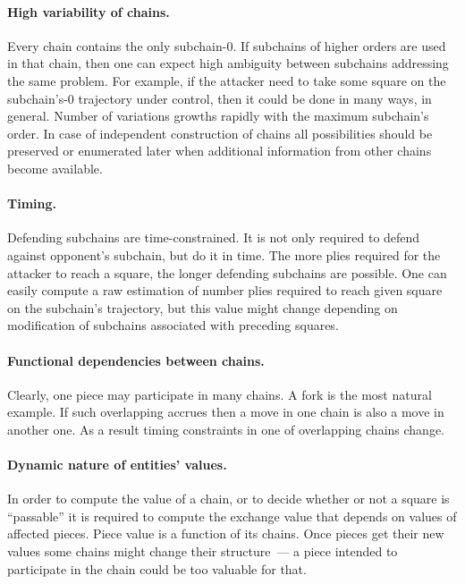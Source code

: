 \documentclass{llncs}
\begin{document}
\paragraph{High variability of chains.} Every chain contains the only
subchain-0. If subchains of higher orders are used in that chain, then
one can expect high ambiguity between subchains addressing the same
problem. For example, if the attacker need to take some square on the
subchain's-0 trajectory under control, then it could be done in many
ways, in general. Number of variations growths rapidly with the
maximum subchain's order. In case of independent construction of
chains all possibilities should be preserved or enumerated later when
additional information from other chains become available.

\paragraph{Timing.} Defending subchains are time-constrained. It is
not only required to defend against opponent's subchain, but do it in
time. The more plies required for the attacker to reach a square, the
longer defending subchains are possible. One can easily compute a raw
estimation of number plies required to reach given square on the
subchain's trajectory, but this value might change depending on
modification of subchains associated with preceding squares.

\paragraph{Functional dependencies between chains.} Clearly, one piece
may participate in many chains. A fork is the most natural example. If
such overlapping accrues then a move in one chain is also a move in
another one. As a result timing constraints in one of overlapping
chains change.

\paragraph{Dynamic nature of entities' values.} In order to compute the value of a chain,
or to decide whether or not a square is ``passable'' it is required to
compute the exchange value that depends on values of affected
pieces. Piece value is a function of its chains. Once pieces get their
new values some chains might change their structure~--- a piece
intended to participate in the chain could be too valuable for that.

\end{document}
